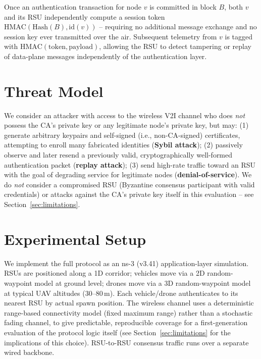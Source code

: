 \documentclass[conference]{IEEEtran}
\begin{document}
Once an authentication transaction for node $v$ is committed in
block $B$, both $v$ and its RSU independently compute a session token
$\mathrm{HMAC}(\mathrm{Hash}(B), \mathrm{id}(v))$ -- requiring no
additional message exchange and no session key ever transmitted over
the air. Subsequent telemetry from $v$ is tagged with
$\mathrm{HMAC}(\text{token}, \text{payload})$, allowing the RSU to
detect tampering or replay of data-plane messages independently of
the authentication layer.

\section{Threat Model}

We consider an attacker with access to the wireless V2I channel who
does \emph{not} possess the CA's private key or any legitimate node's
private key, but may: (1) generate arbitrary keypairs and
self-signed (i.e., non-CA-signed) certificates, attempting to enroll
many fabricated identities (\textbf{Sybil attack}); (2) passively
observe and later resend a previously valid, cryptographically
well-formed authentication packet (\textbf{replay attack}); (3) send
high-rate traffic toward an RSU with the goal of degrading service
for legitimate nodes (\textbf{denial-of-service}). We do \emph{not}
consider a compromised RSU (Byzantine consensus participant with
valid credentials) or attacks against the CA's private key itself in
this evaluation -- see Section~\ref{sec:limitations}.

\section{Experimental Setup}
\label{sec:setup}

We implement the full protocol as an ns-3 (v3.41) application-layer
simulation. RSUs are positioned along a 1D corridor; vehicles move
via a 2D random-waypoint model at ground level; drones move via a 3D
random-waypoint model at typical UAV altitudes (30--80\,m). Each
vehicle/drone authenticates to its nearest RSU by actual spawn
position. The wireless channel uses a deterministic range-based
connectivity model (fixed maximum range) rather than a stochastic
fading channel, to give predictable, reproducible coverage for a
first-generation evaluation of the protocol logic itself (see
Section~\ref{sec:limitations} for the implications of this choice).
RSU-to-RSU consensus traffic runs over a separate wired backbone.
\end{document}
